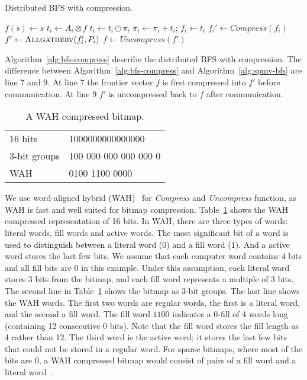 \documentclass[conference]{IEEEtran}
\begin{document}
\begin{algorithm} [t] \label{alg:bfs-compress}
\caption{Distributed BFS with compression.}
$f(s) \gets s$\;
{
  {
    $t_{i} \gets A_{i} \otimes f $\;
    $t_{i} \gets t_{i} \odot \overline{\pi_{i}}$\;
    $\pi_{i} \gets \pi_{i} + t_{i}$; $f_{i} \gets t_{i}$\;
    $f_{i}' \gets Compress(f_{i})$\;
    $f' \gets \textsc{Allgatherv}(f_i',P_i)$\;
    $f \gets Uncompress(f')$\;
  }
}
\end{algorithm}

Algorithm~\ref{alg:bfs-compress} describe the distributed BFS with
compression. The difference between Algorithm~\ref{alg:bfs-compress} and
Algorithm~\ref{alg:spmv-bfs} are line 7 and 9. At line 7 the frontier vector
$f$ is first compressed into $f'$ before communication. At line 9 $f'$ is
uncompressed back to $f$ after communication.

\begin{table}[t]
  \caption{A WAH compressed bitmap.}
  \label{table:wah-example}
  \begin{center}
    \begin{tabular}{ll}
\hline
      16 bits & 1000000000000000 \\
      3-bit groups & 100 000 000 000 000 0\\
      WAH & 0100 1100 0000\\
      \hline
    \end{tabular}
  \end{center}
\end{table}
We use word-aligned hybrid (WAH)~\cite{Wu:WAH} for \textit{Compress} and
\textit{Uncompress} function, as WAH is fast and well suited for bitmap
compression. Table~\ref{table:wah-example} shows the WAH compressed
representation of 16 bits. In WAH, there are three types of words: literal
words, fill words and active words. The most significant bit of a word is used
to distinguish between a literal word (0) and a fill word (1). And a active
word stores the last few bits. We assume that each computer word contains 4
bits and all fill bits are 0 in this example. Under this assumption, each
literal word stores 3 bits from the bitmap, and each fill word represents a
multiple of 3 bits. The second line in Table~\ref{table:wah-example} shows the
bitmap as 3-bit groups. The last line shows the WAH words. The first two words
are regular words, the first is a literal word, and the second a fill
word. The fill word $1100$ indicates a 0-fill of 4 words long (containing 12
consecutive 0 bits). Note that the fill word stores the fill length as 4
rather than 12. The third word is the active word; it stores the last few bits
that could not be stored in a regular word. For sparse bitmaps, where most of
the bits are 0, a WAH compressed bitmap would consist of pairs of a fill word
and a literal word~\cite{Wu:WAH}.
\end{document}
